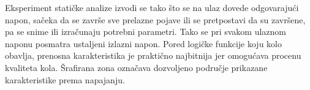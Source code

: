 Eksperiment statičke analize izvodi se tako što se na ulaz dovede odgovarajući napon, sačeka da se završe sve prelazne pojave ili se pretpostavi da su završene, pa se snime ili izračunaju potrebni parametri. Tako se pri svakom ulaznom naponu posmatra ustaljeni izlazni napon. Pored logičke funkcije koju kolo obavlja, prenosna karakteristika je praktično najbitnija jer omogućava procenu kvaliteta kola. Šrafirana zona označava dozvoljeno područje prikazane karakteristike prema napajanju.
